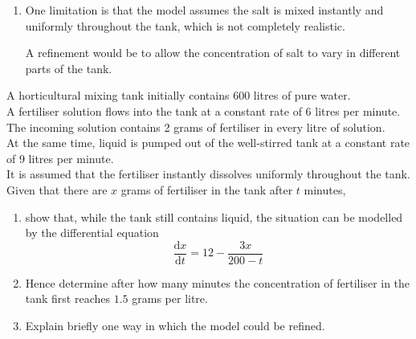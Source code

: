 \documentclass[leqno]{article}
\begin{document}
\begin{enumerate}[
  label=\textbf{\arabic*.},
  leftmargin=*,
  topsep=0pt,
  partopsep=0pt,
  parsep=0pt
]
\begin{djsSolution}
\begin{enumerate}[label=\textbf{(\alph*)}]
  So
  \[
  x=30(60-t)-\frac{(60-t)^3}{120}
  \]

  At $t=30$:
  \begin{align*}
  x(30)&=30(60-30)-\frac{(60-30)^3}{120} \\
       &=30\times 30-\frac{30^3}{120} \\
       &=900-\frac{27000}{120} \\
       &=900-225 \\
       &=675
  \end{align*}

  Hence the number of grams of salt in the tank after $30$ hours is
  \[
  675\,\mathrm{g}
  \]

  \item One limitation is that the model assumes the salt is mixed instantly and uniformly throughout the tank, which is not completely realistic.

  A refinement would be to allow the concentration of salt to vary in different parts of the tank.
\end{enumerate}
\end{djsSolution}


\newpage

\questionitem

A horticultural mixing tank initially contains 600 litres of pure water. \\

A fertiliser solution flows into the tank at a constant rate of 6 litres per minute. The incoming solution contains 2 grams of fertiliser in every litre of solution. \\

At the same time, liquid is pumped out of the well-stirred tank at a constant rate of 9 litres per minute. \\

It is assumed that the fertiliser instantly dissolves uniformly throughout the tank. \\

Given that there are $x$ grams of fertiliser in the tank after $t$ minutes, \\

\begin{enumerate}[label=\textbf{(\alph*)}]
  \item show that, while the tank still contains liquid, the situation can be modelled by the differential equation
  \[
  \frac{\mathrm{d}x}{\mathrm{d}t}=12-\frac{3x}{200-t}
  \]
  \item Hence determine after how many minutes the concentration of fertiliser in the tank first reaches $1.5$ grams per litre.  \\
  \item Explain briefly one way in which the model could be refined.  \\
\end{enumerate}


\end{enumerate}
\end{document}
